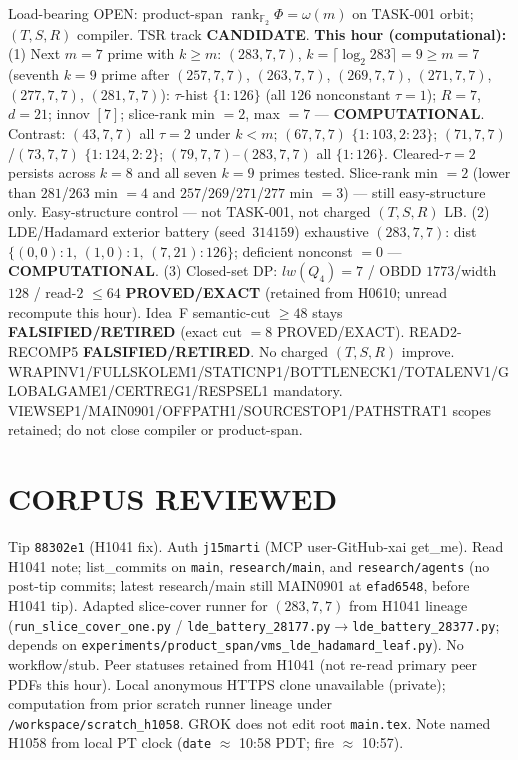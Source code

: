 \documentclass[11pt]{article}
\begin{document}
Load-bearing OPEN: product-span $\operatorname{rank}_{\mathbb F_2}\Phi=\omega(m)$ on TASK-001 orbit;
$(T,S,R)$ compiler. TSR track \textbf{CANDIDATE}.
\textbf{This hour (computational):}
(1) Next $m{=}7$ prime with $k{\ge}m$: $(283,7,7)$, $k=\lceil\log_2 283\rceil=9{\ge}m{=}7$
(seventh $k{=}9$ prime after $(257,7,7)$, $(263,7,7)$, $(269,7,7)$, $(271,7,7)$, $(277,7,7)$, $(281,7,7)$):
$\tau$-hist $\{1{:}126\}$ (all $126$ nonconstant $\tau{=}1$); $R{=}7$, $d{=}21$; innov $[7]$;
slice-rank min $=2$, max $=7$ --- \textbf{COMPUTATIONAL}.
Contrast: $(43,7,7)$ all $\tau{=}2$ under $k{<}m$; $(67,7,7)$ $\{1{:}103,2{:}23\}$;
$(71,7,7)$/$(73,7,7)$ $\{1{:}124,2{:}2\}$; $(79,7,7)$--$(283,7,7)$ all $\{1{:}126\}$.
Cleared-$\tau{=}2$ persists across $k{=}8$ and all seven $k{=}9$ primes tested.
Slice-rank min $=2$ (lower than $281$/$263$ min $=4$ and $257$/$269$/$271$/$277$ min $=3$) --- still easy-structure only.
Easy-structure control --- not TASK-001, not charged $(T,S,R)$ LB.
(2) LDE/Hadamard exterior battery (seed~$314159$) exhaustive $(283,7,7)$:
dist $\{(0,0){:}1,\,(1,0){:}1,\,(7,21){:}126\}$; deficient nonconst $=0$ --- \textbf{COMPUTATIONAL}.
(3) Closed-set DP: $lw(Q_4)=7$ / OBDD $1773$/width $128$ / read-$2$ $\le64$
\textbf{PROVED/EXACT} (retained from H0610; unread recompute this hour).
Idea~F semantic-cut $\ge48$ stays \textbf{FALSIFIED/RETIRED} (exact cut $=8$ PROVED/EXACT).
READ2-RECOMP5 \textbf{FALSIFIED/RETIRED}. No charged $(T,S,R)$ improve.
WRAPINV1/FULLSKOLEM1/STATICNP1/BOTTLENECK1/TOTALENV1/GLOBALGAME1/CERTREG1/RESPSEL1 mandatory.
VIEWSEP1/MAIN0901/OFFPATH1/SOURCESTOP1/PATHSTRAT1 scopes retained; do not close compiler or product-span.

\section*{CORPUS REVIEWED}
Tip \texttt{88302e1} (H1041 fix). Auth \texttt{j15marti} (MCP user-GitHub-xai get\_me).
Read H1041 note; list\_commits on \texttt{main}, \texttt{research/main}, and \texttt{research/agents}
(no post-tip commits; latest research/main still MAIN0901 at \texttt{efad6548}, before H1041 tip).
Adapted slice-cover runner for $(283,7,7)$ from H1041 lineage
(\texttt{run\_slice\_cover\_one.py} / \texttt{lde\_battery\_28177.py}$\to$\texttt{lde\_battery\_28377.py};
depends on \texttt{experiments/product\_span/vms\_lde\_hadamard\_leaf.py}).
No workflow/stub. Peer statuses retained from H1041 (not re-read primary peer PDFs this hour).
Local anonymous HTTPS clone unavailable (private);
computation from prior scratch runner lineage under \texttt{/workspace/scratch\_h1058}.
GROK does not edit root \texttt{main.tex}.
Note named H1058 from local PT clock (\texttt{date} $\approx$ 10:58 PDT; fire $\approx$ 10:57).
\end{document}
